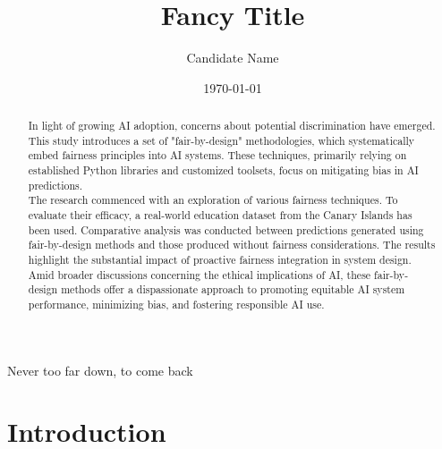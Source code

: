 \documentclass[12pt,a4paper,openright,twoside]{book}
\title{Fancy Title}
\author{Candidate Name}
\date{\today}
\begin{document}
	
\frontmatter



\begin{abstract}
    In light of growing AI adoption, concerns about potential discrimination have emerged. This study introduces a set of "fair-by-design" methodologies, which systematically embed fairness principles into AI systems. These techniques, primarily relying on established Python libraries and customized toolsets, focus on mitigating bias in AI predictions.\\
    The research commenced with an exploration of various fairness techniques. To evaluate their efficacy, a real-world education dataset from the Canary Islands has been used. Comparative analysis was conducted between predictions generated using fair-by-design methods and those produced without fairness considerations. The results highlight the substantial impact of proactive fairness integration in system design.
    Amid broader discussions concerning the ethical implications of AI, these fair-by-design methods offer a dispassionate approach to promoting equitable AI system performance, minimizing bias, and fostering responsible AI use.
\end{abstract}


\begin{acknowledgements} %
Never too far down, to come back
\end{acknowledgements}

\tableofcontents   

\mainmatter

\chapter{Introduction}
\label{chap:introduction}
\end{document}
